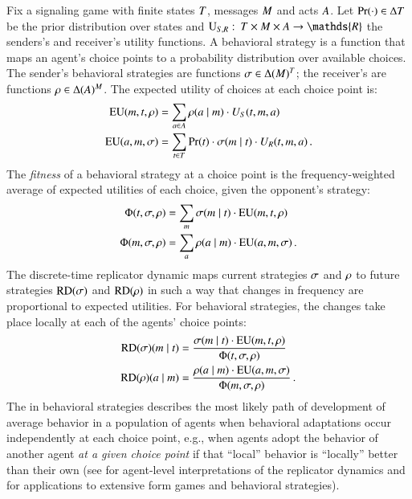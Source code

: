 \documentclass[fleqn,reqno,10pt]{article}
\newcommand{\rd}{\acro{rd}} %
\newcommand{\RD}{\ensuremath{\mathrm{RD}}} %
\begin{document}
Fix a signaling game with finite states $T$, messages $M$
and acts $A$. Let $\Pr(\cdot) \in \Delta{\ensuremath{T}}$ be the prior
distribution over states and $\Util_{\sen,\rec} \mycolon \States
\times \Messgs \times \Acts \rightarrow \mathds{R}$ the senders's and
receiver's utility functions. A behavioral strategy is a function that
maps an agent's choice points to a probability distribution over
available choices. The sender's behavioral strategies are functions
$\sigma \in \Delta(M)^T$; the receiver's are functions
$\rho \in \Delta(A)^M$. The expected utility of choices
at each choice point is:
\begin{align*}
  \mathrm{EU}(m, t, \rho) & = \sum_{a \in A}
  \rho(a \mid m) \cdot U_S(t, m, a) \\
  \mathrm{EU}(a, m, \sigma) & = \sum_{t \in
    T} \Pr(t) \cdot \sigma(m \mid t) \cdot
  U_R(t, m, a) \,.
\end{align*}
The \emph{fitness} of a behavioral strategy at a choice point is the
frequency-weighted average of expected utilities of each choice, given
the opponent's strategy:
\begin{align*}
  \Phi(t,\sigma, \rho) & = \sum_{m} \sigma(m \mid t) \cdot
\mathrm{EU}(m, t,\rho) \\
\Phi(m,\sigma, \rho) & = \sum_{a} \rho(a \mid m)
\cdot \mathrm{EU}(a, m,\sigma)\,.
\end{align*}
The discrete-time replicator dynamic maps current strategies $\sigma$
and $\rho$ to future strategies $\RD(\Sstrat)$ and $\RD(\Rstrat)$
in such a way that changes in frequency are proportional to expected
utilities. For behavioral strategies, the changes take place locally
at each of the agents' choice points:
\begin{align*}
  \RD(\Sstrat)(\messg \probbar \state) & = \frac{\Sstrat(\messg \probbar \state) \cdot
    \EU(\messg, \state,\Rstrat)} {\Phi(\state,\Sstrat, \Rstrat)} \\
    \RD(\Rstrat)(\act \probbar \messg) & = \frac{\Rstrat(\act \probbar \messg) \cdot
    \EU(\act, \messg,\Sstrat)} {\Phi(\messg,\Sstrat, \Rstrat)}  \,.
\end{align*}
The \rd in behavioral strategies describes the most likely path of
development of average behavior in a population
of agents when behavioral adaptations occur independently at each
choice point, e.g., when agents adopt the behavior of another agent
\emph{at a given choice point} if that ``local'' behavior is
``locally'' better than their own (see
\citeauthor{Sandholm2013:Population-Game}
\citeyear{Sandholm2013:Population-Game} for agent-level
interpretations of the replicator dynamics and
\citeauthor{Cressman2003:Evolutionary-Dy}
\citeyear{Cressman2003:Evolutionary-Dy} for applications to extensive
form games and behavioral strategies).
\end{document}
